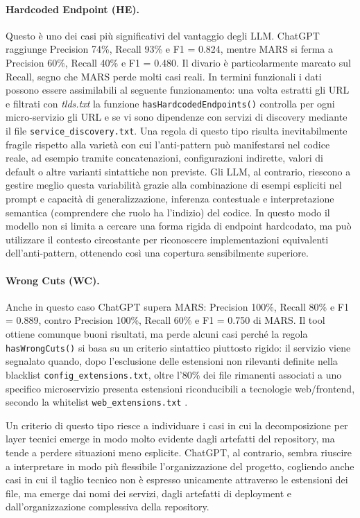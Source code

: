 \paragraph{Hardcoded Endpoint (HE).}
Questo è uno dei casi più significativi del vantaggio degli LLM. ChatGPT raggiunge Precision 74\%, Recall 93\% e F1 = 0.824, mentre MARS si ferma a Precision 60\%, Recall 40\% e F1 = 0.480. Il divario è particolarmente marcato sul Recall, segno che MARS perde molti casi reali. 
In termini funzionali i dati possono essere assimilabili al seguente funzionamento:  
una volta estratti gli URL e filtrati con \textit{tlds.txt} la funzione \texttt{hasHardcodedEndpoints()} controlla per ogni micro-servizio gli URL e se vi sono dipendenze con servizi di discovery mediante il file \texttt{service\_discovery.txt}. Una regola di questo tipo risulta inevitabilmente fragile rispetto alla varietà con cui l’anti-pattern può manifestarsi nel codice reale, ad esempio tramite concatenazioni, configurazioni indirette, valori di default o altre varianti sintattiche non previste.
Gli LLM, al contrario, riescono a gestire meglio questa variabilità grazie alla combinazione di esempi espliciti nel prompt e capacità di generalizzazione, inferenza contestuale e interpretazione semantica (comprendere che ruolo ha l'indizio) del codice. In questo modo il modello non si limita a cercare una forma rigida di endpoint hardcodato, ma può utilizzare il contesto circostante per riconoscere implementazioni equivalenti dell'anti-pattern, ottenendo così una copertura sensibilmente superiore.

\paragraph{Wrong Cuts (WC).}
Anche in questo caso ChatGPT supera MARS: Precision 100\%, Recall 80\% e F1 = 0.889, contro Precision 100\%, Recall 60\% e F1 = 0.750 di MARS. Il tool ottiene comunque buoni risultati, ma perde alcuni casi perché la regola \texttt{hasWrongCuts()} si basa su un criterio sintattico piuttosto rigido: il servizio viene segnalato quando, dopo l'esclusione delle estensioni non rilevanti definite nella blacklist \texttt{config\_extensions.txt}, oltre l'80\% dei file rimanenti associati a uno specifico microservizio presenta estensioni riconducibili a tecnologie web/frontend, secondo la whitelist \texttt{web\_extensions.txt} \cite{MARS, madern2024_mars}.

Un criterio di questo tipo riesce a individuare i casi in cui la decomposizione per layer tecnici emerge in modo molto evidente dagli artefatti del repository, ma tende a perdere situazioni meno esplicite. ChatGPT, al contrario, sembra riuscire a interpretare in modo più flessibile l’organizzazione del progetto, cogliendo anche casi in cui il taglio tecnico non è espresso unicamente attraverso le estensioni dei file, ma emerge dai nomi dei servizi, dagli artefatti di deployment e dall’organizzazione complessiva della repository.

